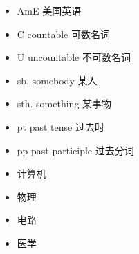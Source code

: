 \documentclass[11pt,a4paper,UTF8,titlepage]{ctexrep} %
\begin{document}
\begin{multicols}{2}
\begin{itemize}[left=0em]
            \item AmE 美国英语
            \item C countable 可数名词
            \item U uncountable 不可数名词
            \item sb. somebody 某人
            \item sth. something 某事物
            \item pt past tense 过去时
            \item pp past participle 过去分词
            \item \quad[计] 计算机
            \item \quad[物] 物理
            \item \quad[电] 电路
            \item \quad[医] 医学
        \end{itemize}
    \end{multicols}

    \ifx\collections\undefined
    \printbibliography %
    \clearpage %
    \printindex %
\end{document}
